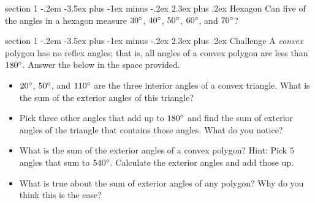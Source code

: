\documentclass[12pt,letterpaper]{article}
\makeatletter
\newenvironment{problem}{\@startsection
       {section}
       {1}
       {-.2em}
       {-3.5ex plus -1ex minus -.2ex}
       {2.3ex plus .2ex}
       {\pagebreak[3]
       \large\bf\noindent{Problem }
       }
       }
\makeatother
\begin{document}
\begin{problem}{Hexagon}
 Can five of the angles in a hexagon measure
 $30\degree$, $40\degree$, $50\degree$, $60\degree$, and
 $70\degree$?
\end{problem}

\begin{problem}{Challenge}
 A \emph{convex} polygon has no reflex angles; that is, all
 angles of a convex polygon are less than $180\degree$.
 Answer the below in the space provided.
 
 \begin{itemize}
  \item $20\degree$, $50\degree$, and $110\degree$ are the
  three interior angles of a convex triangle. What is the
  sum of the exterior angles of this triangle?
  \item Pick three other angles that add up to $180\degree$
  and find the sum of exterior angles of the triangle that
  contains those angles. What do you notice?
  \item What is the sum of the exterior angles of a convex
  polygon? Hint: Pick $5$ angles that sum to $540\degree$.
  Calculate the exterior angles and add those up.
  \item What is true about the sum of exterior angles of
  any polygon? Why do you think this is the case?
 \end{itemize}

\end{problem}
\end{document}

